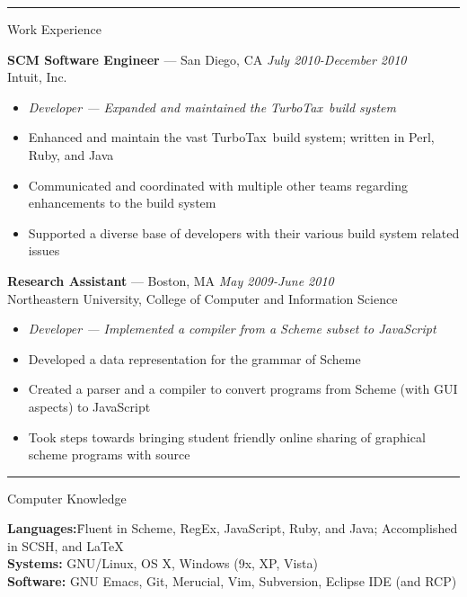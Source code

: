 \documentclass[10pt]{letter}
\begin{document}
\rule{\linewidth}{.5pt}

{\Large Work Experience}
\begin{tabbing}
{\large \bf SCM Software Engineer} --- San Diego, CA \` \textit{July 2010-December 2010} \\
Intuit, Inc.

\end{tabbing}\vspace{-10pt}

\begin{itemize}
\setlength\itemsep{1pt}
\item [] \textit{Developer --- Expanded and maintained the TurboTax\textregistered~build system}
\item Enhanced and maintain the vast TurboTax\textregistered~build system; written in Perl, Ruby, and Java
\item Communicated and coordinated with multiple other teams regarding enhancements to the build system
\item Supported a diverse base of developers with their various build system related issues
\end{itemize}

\begin{tabbing}
{\large \bf Research Assistant} --- Boston, MA \` \textit{May 2009-June 2010} \\
Northeastern University, College of Computer and Information Science
\end{tabbing}\vspace{-10pt}
\begin{itemize}
\setlength\itemsep{1pt}
\item [] \textit{Developer --- Implemented a compiler from a Scheme subset to JavaScript}
\item Developed a data representation for the grammar of Scheme
\item Created a parser and a compiler to convert programs from Scheme (with GUI aspects) to JavaScript
\item Took steps towards bringing student friendly online sharing of graphical scheme programs with source
\end{itemize}

\rule{\linewidth}{.5pt}

{\Large Computer Knowledge}
\begin{tabbing}
\textbf{Languages:}\hspace{.2in}\= Fluent in Scheme, RegEx, JavaScript, Ruby,
                   and Java; Accomplished in SCSH, and \LaTeX\\
\textbf{Systems:}\> GNU/Linux, OS X, Windows (9x, XP, Vista)\\
\textbf{Software:}\> GNU Emacs, Git, Merucial, Vim, Subversion,
                     Eclipse IDE (and RCP)
\end{tabbing}\vspace{-15pt}
\end{document}
